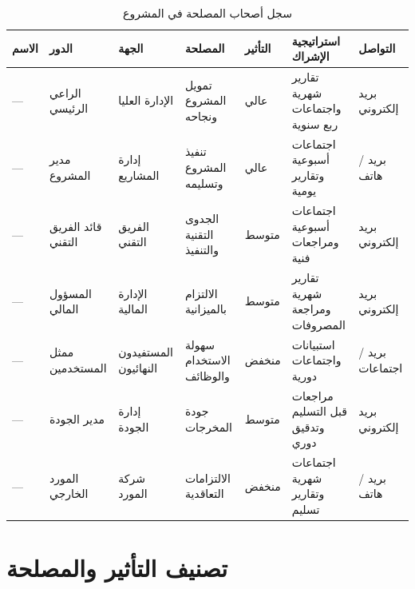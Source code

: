 \documentclass[11pt,a4paper]{article}
\begin{document}
\begin{table}[H]
\centering
\caption{سجل أصحاب المصلحة في المشروع}
\renewcommand{\arraystretch}{1.4}
\small
\begin{tabularx}{\textwidth}{L{2.5cm} L{2.5cm} L{2.5cm} L{3cm} C{1.3cm} L{3cm} L{2.5cm}}
\toprule
\textbf{الاسم} & \textbf{الدور} & \textbf{الجهة} & \textbf{المصلحة} & \textbf{التأثير} & \textbf{استراتيجية الإشراك} & \textbf{التواصل} \\
\midrule
--- & الراعي الرئيسي & الإدارة العليا & تمويل المشروع ونجاحه & عالي & تقارير شهرية واجتماعات ربع سنوية & بريد إلكتروني \\
--- & مدير المشروع & إدارة المشاريع & تنفيذ المشروع وتسليمه & عالي & اجتماعات أسبوعية وتقارير يومية & بريد / هاتف \\
--- & قائد الفريق التقني & الفريق التقني & الجدوى التقنية والتنفيذ & متوسط & اجتماعات أسبوعية ومراجعات فنية & بريد إلكتروني \\
--- & المسؤول المالي & الإدارة المالية & الالتزام بالميزانية & متوسط & تقارير شهرية ومراجعة المصروفات & بريد إلكتروني \\
--- & ممثل المستخدمين & المستفيدون النهائيون & سهولة الاستخدام والوظائف & منخفض & استبيانات واجتماعات دورية & بريد / اجتماعات \\
--- & مدير الجودة & إدارة الجودة & جودة المخرجات & متوسط & مراجعات قبل التسليم وتدقيق دوري & بريد إلكتروني \\
--- & المورد الخارجي & شركة المورد & الالتزامات التعاقدية & منخفض & اجتماعات شهرية وتقارير تسليم & بريد / هاتف \\
\bottomrule
\end{tabularx}
\end{table}

\section{تصنيف التأثير والمصلحة}
\label{sec:classification}
\end{document}
